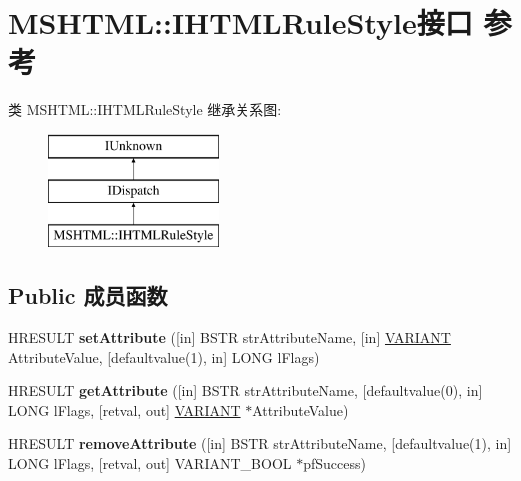 \hypertarget{interface_m_s_h_t_m_l_1_1_i_h_t_m_l_rule_style}{}\section{M\+S\+H\+T\+ML\+:\+:I\+H\+T\+M\+L\+Rule\+Style接口 参考}
\label{interface_m_s_h_t_m_l_1_1_i_h_t_m_l_rule_style}
类 M\+S\+H\+T\+ML\+:\+:I\+H\+T\+M\+L\+Rule\+Style 继承关系图\+:\begin{figure}[H]
\begin{center}
\leavevmode
\includegraphics[height=3.000000cm]{interface_m_s_h_t_m_l_1_1_i_h_t_m_l_rule_style}
\end{center}
\end{figure}
\subsection*{Public 成员函数}
\begin{DoxyCompactItemize}
\item 
\mbox{\label{interface_m_s_h_t_m_l_1_1_i_h_t_m_l_rule_style_abf6572f380fbd70ff3a5e8befe60a241}} 
H\+R\+E\+S\+U\+LT {\bfseries set\+Attribute} (\mbox{[}in\mbox{]} B\+S\+TR str\+Attribute\+Name, \mbox{[}in\mbox{]} \hyperlink{structtag_v_a_r_i_a_n_t}{V\+A\+R\+I\+A\+NT} Attribute\+Value, \mbox{[}defaultvalue(1), in\mbox{]} L\+O\+NG l\+Flags)
\item 
\mbox{\label{interface_m_s_h_t_m_l_1_1_i_h_t_m_l_rule_style_a4721f8f6f85bb04c5f247333149b22f5}} 
H\+R\+E\+S\+U\+LT {\bfseries get\+Attribute} (\mbox{[}in\mbox{]} B\+S\+TR str\+Attribute\+Name, \mbox{[}defaultvalue(0), in\mbox{]} L\+O\+NG l\+Flags, \mbox{[}retval, out\mbox{]} \hyperlink{structtag_v_a_r_i_a_n_t}{V\+A\+R\+I\+A\+NT} $\ast$Attribute\+Value)
\item 
\mbox{\label{interface_m_s_h_t_m_l_1_1_i_h_t_m_l_rule_style_a09a833f441e54094f777a34fa3de2637}} 
H\+R\+E\+S\+U\+LT {\bfseries remove\+Attribute} (\mbox{[}in\mbox{]} B\+S\+TR str\+Attribute\+Name, \mbox{[}defaultvalue(1), in\mbox{]} L\+O\+NG l\+Flags, \mbox{[}retval, out\mbox{]} V\+A\+R\+I\+A\+N\+T\+\_\+\+B\+O\+OL $\ast$pf\+Success)
\end{DoxyCompactItemize}
